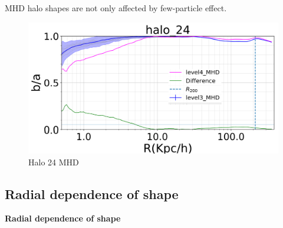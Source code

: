 \documentclass[xcolor=dvipsnames]{beamer}
\begin{document}
\begin{frame}
\centering
MHD halo shapes are not only affected by few-particle effect.
\begin{figure}[!ht]
  \centering  
  \includegraphics[width=1\columnwidth]{./pics/rand_conv_halo24_MHD.png}
  \caption{Halo 24 MHD}
\end{figure}
\end{frame}


\subsection{Radial dependence of shape}
\begin{frame}
\centering
\LARGE
\textbf{Radial dependence of shape}
\normalsize
\end{frame}
\end{document}

